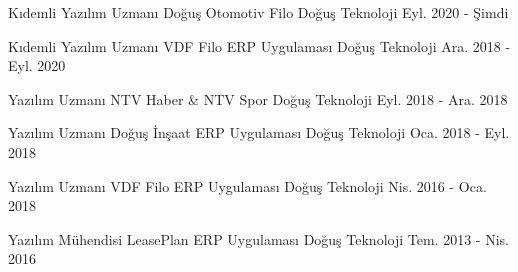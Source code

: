 

\begin{cventries}

  \cventry
    {Kıdemli Yazılım Uzmanı} %
    {Doğuş Otomotiv Filo} %
    {Doğuş Teknoloji} %
    {Eyl. 2020 - Şimdi} %
    {}

  \cventry
    {Kıdemli Yazılım Uzmanı} %
    {VDF Filo ERP Uygulaması} %
    {Doğuş Teknoloji} %
    {Ara. 2018 - Eyl. 2020} %
    {}

  \cventry
    {Yazılım Uzmanı} %
    {NTV Haber \& NTV Spor} %
    {Doğuş Teknoloji} %
    {Eyl. 2018 - Ara. 2018} %
    {}

  \cventry
    {Yazılım Uzmanı} %
    {Doğuş İnşaat ERP Uygulaması} %
    {Doğuş Teknoloji} %
    {Oca. 2018 - Eyl. 2018} %
    {}

  \cventry
    {Yazılım Uzmanı} %
    {VDF Filo ERP Uygulaması} %
    {Doğuş Teknoloji} %
    {Nis. 2016 - Oca. 2018} %
    {}

  \cventry
    {Yazılım Mühendisi} %
    {LeasePlan ERP Uygulaması} %
    {Doğuş Teknoloji} %
    {Tem. 2013 - Nis. 2016} %
    {}

\end{cventries}
